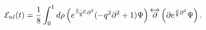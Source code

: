 \begin{equation}
\label{sr} {\cal E}_{nl}(t)=\frac18\int_0^1 d\rho\left(
e^{\frac{2-\rho}{8}{\partial}^2}(-q^2 {\partial}^2+1 ) \Psi
\right) \overleftrightarrow{\partial}
  \left(\partial  e^{\frac{\rho}{8}{\partial}^2} \Psi \right).
\end{equation}

